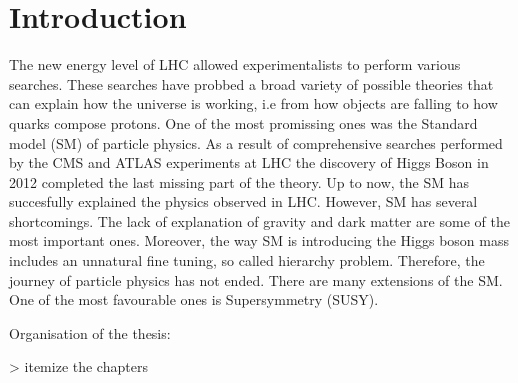 \chapter{Introduction}
The new energy level of LHC allowed experimentalists to perform various searches.
These searches have probbed a broad variety of possible theories that can explain how the universe is working, i.e
from how objects are falling to how quarks compose protons.
One of the most promissing ones was the Standard model (SM) of particle physics. As a result of comprehensive searches performed by the CMS and ATLAS experiments at LHC the discovery of Higgs Boson in 2012 completed the last missing part of the theory.
Up to now, the SM has succesfully explained the physics observed in LHC.
However, SM has several shortcomings.
The lack of explanation of gravity and dark matter are some of the most important ones.
 Moreover, the way SM is introducing the Higgs boson mass includes an unnatural fine tuning, so called hierarchy problem. 
Therefore, the journey of particle physics has not ended. 
There are many extensions of the SM. One of the most favourable ones is Supersymmetry (SUSY). 


\newpage
Organisation of the thesis:

> itemize the chapters


